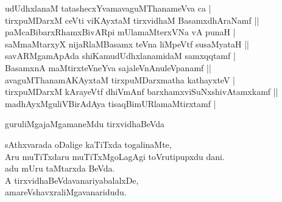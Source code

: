 \begin{entry}
\begin{shl}
udUdhxlanaM tatashecxYvamavaguMThanameVva ca |\\
tirxpuMDarxM ceVti viKAyxtaM tirxvidhaM BasamxdhAraNamf ||\\
paMcaBibarxRhamxBivARpi mUlamaMterxVNa vA punaH |\\
saMmaMtarxyX nijaRlaMBasamx teVna liMpeVtf susaMyataH ||\\
savARMgamApAda shiKamudUdhxlanamidaM samxqqtamf |\\
BasamxnA maMtirxteVneYva sajaleVnAnuleVpanamf ||\\
avaguMThanamAKAyxtaM tirxpuMDarxmatha kathayxteV |\\
tirxpuMDarxM kArayeVtf dhiVmAnf barxhamxviSuNxshivAtamxkamf ||\\
madhAyxMguliVBirAdAya tisaqBimURlamaMtirxtamf |
\end{shl}
\end{entry}

\begin{entry}
\gl{}
\begin{shl}
guruliMgajaMgamaneMdu  tirxvidhaBeVda
\end{shl}
\begin{shl}
sAthxvarada oDalige kaTiTxda togalinaMte,\\
Aru muTiTxdaru muTiTxMgoLagAgi toVrutipupxdu dani.\\
adu mUru taMtarxda BeVda.\\
A tirxvidhaBeVdavanariyabalalxDe,\\
amareVshavxraliMgavanaridudu.
\end{shl}
\end{entry}


